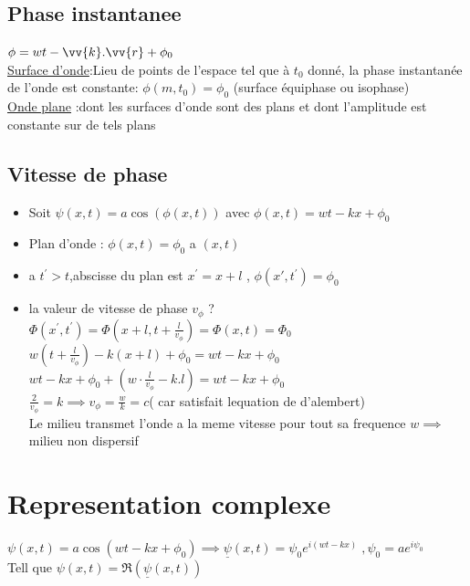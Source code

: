 \documentclass[12pt]{book}
\begin{document}
            \subsection{Phase instantanee}
                $\phi = wt - \vv{k}.\vv{r} + \phi_0$\\
                \underline{Surface d'onde}:Lieu de points de l'espace tel que à $t_0$ donné, la phase instantanée de l'onde est constante: $ \phi(m,t_0) = \phi_0 $ (surface équiphase ou isophase)\\
                \underline{Onde plane} :dont les surfaces d'onde sont des plans et dont l'amplitude est constante sur de tels plans\\
            \subsection{Vitesse de phase}
                \begin{itemize}
                    \item Soit $\psi(x,t) = a\cos(\phi(x,t))$ avec $\phi(x,t) = wt-kx+\phi_0$ 
                    \item Plan d'onde : $\phi(x,t) = \phi_0$ a $(x,t)$
                    \item a $t^{'} > t $,abscisse du plan est $x^{'}=x+l$ , $\phi(x{'},t^{'}) = \phi_0$
                    \item la valeur de vitesse de phase $v_\phi$ ? \\
                    $\Phi\left(x^{\prime}, t^{\prime}\right)=\Phi\left(x+l, t+\frac{l}{v_{\phi}}\right)=\Phi(x, t)=\Phi_{0}$\\
                    $w\left(t+\frac{l}{v_{\phi}}\right)-k(x+l)+\phi_{0}=w t-k x+\phi_{0}$\\
                    $w t-k x+\phi_{0}+\left(w \cdot \frac{l}{v_{\phi}}-k . l\right)=w t-k x+\phi_{0}$\\
                    $\frac{2}{v_\phi} = k \implies v_\phi = \frac{w}{k} = c$( car satisfait lequation de d'alembert) \\
                    Le milieu transmet l'onde a la meme vitesse pour tout sa frequence $w \implies$ milieu non dispersif
                \end{itemize}
        \section{Representation complexe}   
            $ \psi(x,t) = a\cos(wt-kx+\phi_0) \implies\underline{\psi}(x,t)=\psi_0e^{i(wt-kx)} \;, \psi_0 =ae^{i\psi_0} $ \\
            Tell que $\psi(x,t)=\mathfrak{R}(\underline{\psi}(x,t)) $
\end{document}
